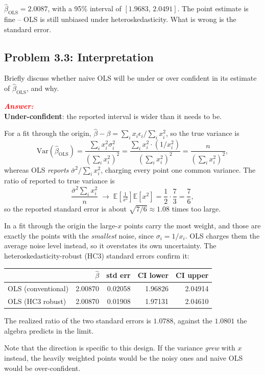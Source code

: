 \documentclass[11pt, letterpaper]{article}
\newcommand{\E}{\mathbb{E}}
\newcommand{\Var}{\mathrm{Var}}
\newcommand{\subproblem}[1]{\subsection*{Problem #1}}
\newcommand{\answer}{\textbf{\textit{\textcolor{red}{Answer:}}}\\}
\begin{document}
$\hat{\beta}_{\text{OLS}} = 2.0087$, with a 95\% interval of $[1.9683,\, 2.0491]$. The point estimate
is fine -- OLS is still unbiased under heteroskedasticity. What is wrong is the standard error.


\subproblem{3.3: Interpretation}

Briefly discuss whether naive OLS will be under or over confident in its estimate of $\hat{\beta}_{\text{OLS}}$,
and why.

\answer
\textbf{Under-confident}: the reported interval is wider than it needs to be.

For a fit through the origin, $\hat{\beta} - \beta = \sum_i x_i \epsilon_i / \sum_i x_i^2$, so the
true variance is
$$
\Var(\hat{\beta}_{\text{OLS}}) = \frac{\sum_i x_i^2 \sigma_i^2}{\left(\sum_i x_i^2\right)^2}
= \frac{\sum_i x_i^2 \cdot (1/x_i^2)}{\left(\sum_i x_i^2\right)^2}
= \frac{n}{\left(\sum_i x_i^2\right)^2},
$$
whereas OLS \textit{reports} $\bar{\sigma}^2 / \sum_i x_i^2$, charging every point one common
variance. The ratio of reported to true variance is
$$
\frac{\bar{\sigma}^2 \sum_i x_i^2}{n} \;\longrightarrow\;
\E\!\left[\tfrac{1}{x^2}\right] \E\!\left[x^2\right] = \frac{1}{2} \cdot \frac{7}{3} = \frac{7}{6},
$$
so the reported standard error is about $\sqrt{7/6} \approx 1.08$ times too large.

In a fit through the origin the large-$x$ points carry the most weight, and those are exactly the
points with the \textit{smallest} noise, since $\sigma_i = 1/x_i$. OLS charges them the average
noise level instead, so it overstates its own uncertainty. The heteroskedasticity-robust (HC3)
standard errors confirm it:

\begin{center}
\begin{tabular}{lrrrr}
\toprule
 & $\hat{\beta}$ & std err & CI lower & CI upper \\
\midrule
OLS (conventional) & 2.00870 & 0.02058 & 1.96826 & 2.04914 \\
OLS (HC3 robust)   & 2.00870 & 0.01908 & 1.97131 & 2.04610 \\
\bottomrule
\end{tabular}
\end{center}

The realized ratio of the two standard errors is $1.0788$, against the $1.0801$ the algebra
predicts in the limit.

Note that the direction is specific to this design. If the variance \textit{grew} with $x$ instead,
the heavily weighted points would be the noisy ones and naive OLS would be over-confident.
\end{document}
